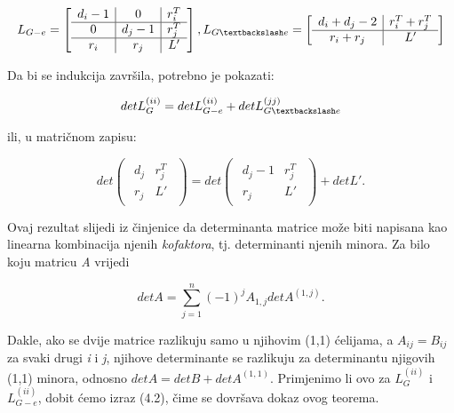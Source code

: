 \documentclass[times, utf8, zavrsni]{fer}
\begin{document}
\[
L_{G - e} = 
\begin{bmatrix}
	\begin{array}{c|c|c}
		d_i - 1 & 0 & r_i^T \\
		\hline
		0 & d_j - 1 & r_j^T \\
		\hline
		r_i & r_j & L'
	\end{array}
\end{bmatrix},
L_{G \textbackslash e} = 
\begin{bmatrix}
	\begin{array}{c|c}
		d_i + d_j - 2 & r_i^T + r_j^T \\
		\hline
		r_i + r_j & L'
	\end{array}
\end{bmatrix}
\]

Da bi se indukcija završila, potrebno je pokazati:

\begin{equation}
	detL_G^{(ii)} = detL_{G - e}^{(ii)} + detL_{G \textbackslash e}^{(jj)}
\end{equation}

ili, u matričnom zapisu:

\[
det
\begin{pmatrix}
	\begin{array}{c|c}
		d_j & r_j^T \\
		\hline
		r_j & L'
	\end{array}
\end{pmatrix}
= det
\begin{pmatrix}
	\begin{array}{c|c}
		d_j - 1 & r_j^T \\
		\hline
		r_j & L'
	\end{array}
\end{pmatrix}
+ detL'.
\]

Ovaj rezultat slijedi iz činjenice da determinanta matrice može biti napisana kao linearna kombinacija njenih \textit{kofaktora}, tj. determinanti njenih minora. Za bilo koju matricu \textit{A} vrijedi

\begin{equation}
	detA = \sum_{j = 1}^{n} (-1)^j A_{1,j} detA^{(1,j)}.
\end{equation}

Dakle, ako se dvije matrice razlikuju samo u njihovim (1,1) ćelijama, a $A_{ij} = B_{ij}$ za svaki drugi \textit{i} i \textit{j}, njihove determinante se razlikuju za determinantu njigovih (1,1) minora, odnosno $detA = detB + detA^{(1,1)}.$ Primjenimo li ovo za $L_G^{(ii)}$ i $L_{G - e}^{(ii)}$, dobit ćemo izraz (4.2), čime se dovršava dokaz ovog teorema.
\end{document}
